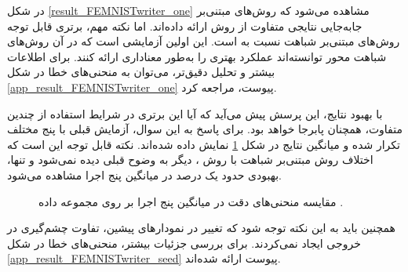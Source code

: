 در شکل
\ref{result_FEMNISTwriter_one}
مشاهده می‌شود که روش‌های مبتنی‌بر جابه‌جایی نتایجی متفاوت از روش
ارائه داده‌اند. اما نکته مهم، برتری قابل توجه روش‌های مبتنی‌بر شباهت نسبت به
است. این اولین آزمایشی است که در آن روش‌های شباهت محور توانسته‌اند عملکرد بهتری را به‌طور معناداری ارائه کنند. برای اطلاعات بیشتر و تحلیل دقیق‌تر، می‌توان به منحنی‌های خطا در شکل
\ref{app_result_FEMNISTwriter_one}
پیوست، مراجعه کرد.



با بهبود نتایج، این پرسش پیش می‌آید که آیا این برتری در شرایط استفاده از چندین
متفاوت، همچنان پابرجا خواهد بود. برای پاسخ به این سوال، آزمایش قبلی با پنج
مختلف تکرار شده و میانگین نتایج در شکل
\ref{result_FEMNISTwriter_seed}
نمایش داده شده‌اند. نکته قابل توجه این است که اختلاف روش مبتنی‌بر شباهت با روش
%
، دیگر به وضوح قبلی دیده نمی‌شود و تنها، بهبودی حدود یک درصد در میانگین پنج اجرا مشاهده می‌شود.
\begin{figure}[t]
	\centering
	\hspace{0.8mm}
	\caption{
		مقایسه منحنی‌های دقت در میانگین پنج اجرا بر روی مجموعه داده
		.
	}
	\label{result_FEMNISTwriter_seed}
\end{figure}
همچنین باید به این نکته توجه شود که تغییر
در نمودارهای پیشین، تفاوت چشم‌گیری در خروجی ایجاد نمی‌کردند.
برای بررسی جزئیات بیشتر، منحنی‌های خطا در شکل
\ref{app_result_FEMNISTwriter_seed}
پیوست ارائه شده‌اند.


